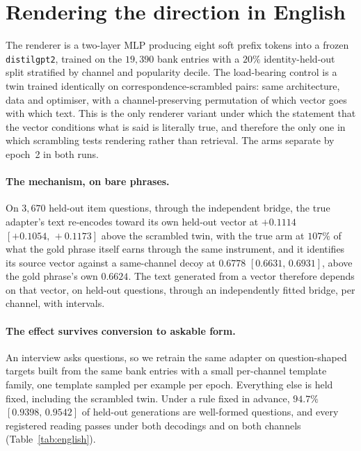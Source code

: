 \documentclass[11pt]{article}
\begin{document}
\section{Rendering the direction in English}
\label{sec:english}

The renderer is a two-layer MLP producing eight soft prefix tokens into a frozen \texttt{distilgpt2},
trained on the $19{,}390$ bank entries with a $20\%$ identity-held-out split stratified by channel and
popularity decile. The load-bearing control is a twin trained identically on correspondence-scrambled
pairs: same architecture, data and optimiser, with a channel-preserving permutation of which vector
goes with which text. This is the only renderer variant under which the statement that the vector
conditions what is said is literally true, and therefore the only one in which scrambling tests
rendering rather than retrieval. The arms separate by epoch~2 in both runs.

\paragraph{The mechanism, on bare phrases.} On $3{,}670$ held-out item questions, through the
independent bridge, the true adapter's text re-encodes toward its own held-out vector at $+0.1114$
$[+0.1054,\,+0.1173]$ above the scrambled twin, with the true arm at $107\%$ of what the gold phrase
itself earns through the same instrument, and it identifies its source vector against a same-channel
decoy at $0.6778$ $[0.6631,\,0.6931]$, above the gold phrase's own $0.6624$. The text generated from a
vector therefore depends on that vector, on held-out questions, through an independently fitted
bridge, per channel, with intervals.

\paragraph{The effect survives conversion to askable form.} An interview asks questions, so we retrain
the same adapter on question-shaped targets built from the same bank entries with a small per-channel
template family, one template sampled per example per epoch. Everything else is held fixed, including
the scrambled twin. Under a rule fixed in advance, $94.7\%$ $[0.9398,\,0.9542]$ of held-out
generations are well-formed questions, and every registered reading passes under both decodings and on
both channels (Table~\ref{tab:english}).
\end{document}
